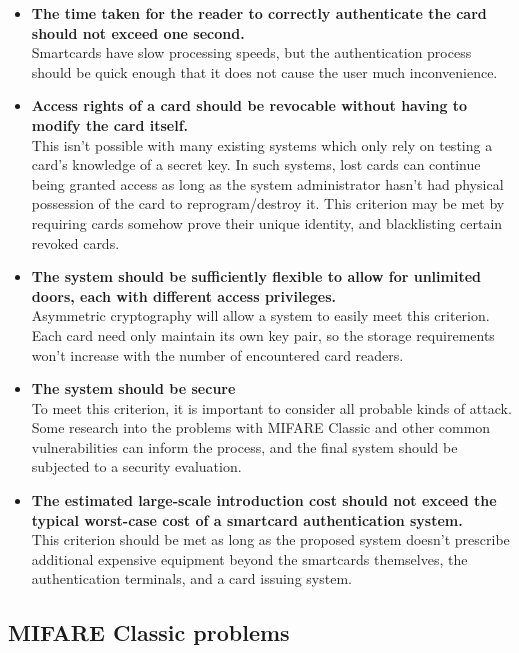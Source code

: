 \documentclass[12pt]{article}
\begin{document}
\begin{itemize}
	\item \textbf{The time taken for the reader to correctly authenticate the card should not exceed one second.}\\
	Smartcards have slow processing speeds, but the authentication process should be quick enough that it does not cause the user much inconvenience.
	
	\item \textbf{Access rights of a card should be revocable without having to modify the card itself.}\\
	This isn't possible with many existing systems which only rely on testing a card's knowledge of a secret key. In such systems, lost cards can continue being granted access as long as the system administrator hasn't had physical possession of the card to reprogram/destroy it. This criterion may be met by requiring cards somehow prove their unique identity, and blacklisting certain revoked cards.
	
	\item \textbf{The system should be sufficiently flexible to allow for unlimited doors, each with different access privileges.}\\
	Asymmetric cryptography will allow a system to easily meet this criterion. Each card need only maintain its own key pair, so the storage requirements won't increase with the number of encountered card readers.
	
	\item \textbf{The system should be secure}\\
	To meet this criterion, it is important to consider all probable kinds of attack. Some research into the problems with MIFARE Classic and other common vulnerabilities can inform the process, and the final system should be subjected to a security evaluation.
	
	\item \textbf{The estimated large-scale introduction cost should not exceed the typical worst-case cost of a smartcard authentication system.}\\
	This criterion should be met as long as the proposed system doesn't prescribe additional expensive equipment beyond the smartcards themselves, the authentication terminals, and a card issuing system.
	
	
\end{itemize}

\subsection{MIFARE Classic problems}
\label{sec:mifare_problems}
\end{document}
